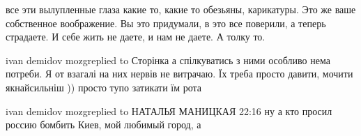 все эти вылупленные глаза какие то, какие то обезьяны, карикатуры. Это же ваше
собственное воображение. Вы это придумали, в это все поверили, а теперь
страдаете. И себе жить не даете, и нам не даете. А толку то.

ivan demidov mozgreplied to Сторінка
а спілкуватись з ними особливо нема потреби. Я от взагалі на них нервів не
витрачаю. Їх треба просто давити, мочити якнайсильніш )) просто тупо затикати
їм рота
















ivan demidov mozgreplied to НАТАЛЬЯ МАНИЦКАЯ
22:16
ну а кто просил россию бомбить Киев, мой любимый город, а

